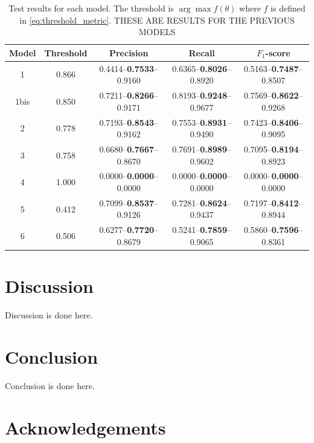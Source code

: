 \documentclass[10pt,conference]{IEEEtran}
\begin{document}
\begin{table}[!ht]
    \begin{center}
        \begin{tabular}{||c | c c c c||} 
            \hline
            Model
            & Threshold
            & Precision
            & Recall
            & $F_1$-score
            \\ [0.5ex] 
            \hline\hline
            1
            & 0.866
            & 0.4414--\textbf{0.7533}--0.9160
            & 0.6365--\textbf{0.8026}--0.8920
            & 0.5163--\textbf{0.7487}--0.8507
            \\ \hline
            1bis
            & 0.850
            & 0.7211--\textbf{0.8266}--0.9171
            & 0.8193--\textbf{0.9248}--0.9677
            & 0.7569--\textbf{0.8622}--0.9268
            \\ \hline
            2
            & 0.778
            & 0.7193--\textbf{0.8543}--0.9162
            & 0.7553--\textbf{0.8931}--0.9490
            & 0.7423--\textbf{0.8406}--0.9095
            \\ \hline
            3
            & 0.758
            & 0.6680--\textbf{0.7667}--0.8670
            & 0.7691--\textbf{0.8989}--0.9602
            & 0.7095--\textbf{0.8194}--0.8923
            \\ \hline
            4
            & 1.000
            & 0.0000--\textbf{0.0000}--0.0000
            & 0.0000--\textbf{0.0000}--0.0000
            & 0.0000--\textbf{0.0000}--0.0000
            \\ \hline
            5
            & 0.412
            & 0.7099--\textbf{0.8537}--0.9126
            & 0.7281--\textbf{0.8624}--0.9437
            & 0.7197--\textbf{0.8412}--0.8944
            \\ \hline
            6
            & 0.506
            & 0.6277--\textbf{0.7720}--0.8679
            & 0.5241--\textbf{0.7859}--0.9065
            & 0.5860--\textbf{0.7596}--0.8361
            \\ \hline
        \end{tabular}
    \end{center}
    \caption{Test results for each model.
    The threshold is $\arg\max f(\theta)$ where $f$ is defined in \autoref{eq:threshold_metric}.
    THESE ARE RESULTS FOR THE PREVIOUS MODELS}
    \label{tbl:test_results}
\end{table}
  
 


\section{Discussion}
Discussion is done here.

\section{Conclusion}
Conclusion is done here.

\section*{Acknowledgements}



\end{document}
